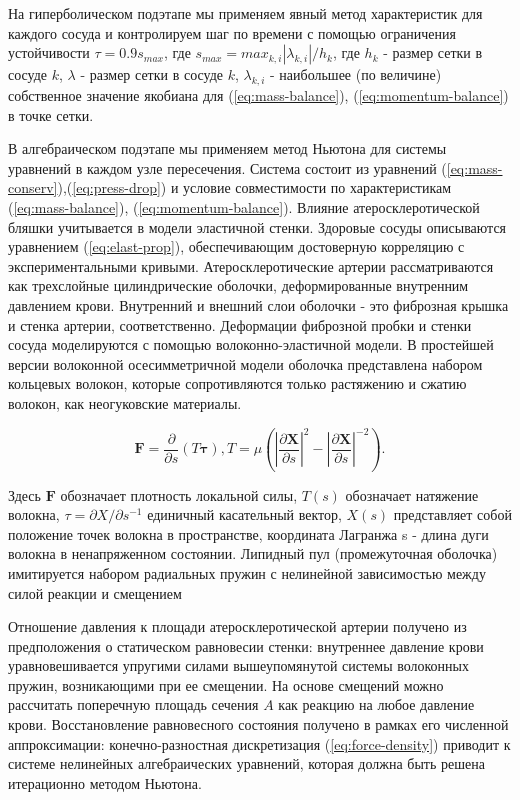 \documentclass[a4paper, 14pt]{article}
\begin{document}
На гиперболическом подэтапе мы применяем явный метод характеристик для каждого сосуда и контролируем шаг по времени с помощью ограничения устойчивости $\tau = 0.9 s_{max}$, где $s_{max}=max_{k,i}|\lambda _{k,i}|/h_k$, где $h_k$ - размер сетки в сосуде $k$, $\lambda$ - размер сетки в сосуде $k$,  $\lambda _{k,i}$ - наибольшее (по величине) собственное значение якобиана для  (\ref{eq:mass-balance}), (\ref{eq:momentum-balance}) в точке сетки.

В алгебраическом подэтапе мы применяем метод Ньютона для системы уравнений в каждом узле пересечения. Система состоит из уравнений (\ref{eq:mass-conserv}),(\ref{eq:press-drop}) и условие совместимости по характеристикам  (\ref{eq:mass-balance}), (\ref{eq:momentum-balance}). Влияние атеросклеротической бляшки учитывается в модели эластичной стенки. Здоровые сосуды описываются уравнением (\ref{eq:elast-prop}), обеспечивающим достоверную корреляцию с экспериментальными кривыми. Атеросклеротические артерии рассматриваются как трехслойные цилиндрические оболочки, деформированные внутренним давлением крови. Внутренний и внешний слои оболочки - это фиброзная крышка и стенка артерии, соответственно. Деформации фиброзной пробки и стенки сосуда моделируются с помощью волоконно-эластичной модели. В простейшей версии волоконной осесимметричной модели оболочка представлена набором кольцевых волокон, которые сопротивляются только растяжению и сжатию волокон, как неогуковские материалы.

\begin{equation}
    \label{eq:force-density}
    \mathbf{F}=\frac{\partial}{\partial s}(T\mathbf{\tau}), T=\mu(|\frac{\partial \mathbf{X}}{\partial s}|^2-|\frac{\partial \mathbf{X}}{\partial s}|^{-2}).
\end{equation}

Здесь $\mathbf{F}$ обозначает плотность локальной силы, $T(s)$ обозначает натяжение волокна, $\tau =\partial X/\partial s^{-1}$ единичный касательный вектор, $X(s)$ представляет собой положение точек волокна в пространстве, координата Лагранжа s - длина дуги волокна в ненапряженном состоянии. Липидный пул (промежуточная оболочка) имитируется набором радиальных пружин с нелинейной зависимостью между силой реакции и смещением

Отношение давления к площади атеросклеротической артерии получено из предположения о статическом равновесии стенки: внутреннее давление крови уравновешивается упругими силами вышеупомянутой системы волоконных пружин, возникающими при ее смещении. На основе смещений можно рассчитать поперечную площадь сечения $A$ как реакцию на любое давление крови. 
Восстановление равновесного состояния получено в рамках его численной аппроксимации: конечно-разностная дискретизация (\ref{eq:force-density}) приводит к системе нелинейных алгебраических уравнений, которая должна быть решена итерационно методом Ньютона.
\end{document}
